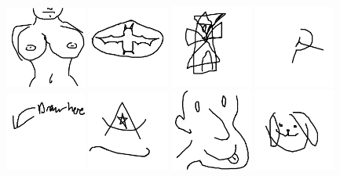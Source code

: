 \includegraphics[width=0.2\textwidth]{art/Safari_6.png}
\includegraphics[width=0.2\textwidth]{art/Safari_60.png}
\includegraphics[width=0.2\textwidth]{art/Safari_61.png}
\includegraphics[width=0.2\textwidth]{art/Safari_62.png}
\includegraphics[width=0.2\textwidth]{art/Safari_63.png}
\includegraphics[width=0.2\textwidth]{art/Safari_64.png}
\includegraphics[width=0.2\textwidth]{art/Safari_65.png}
\includegraphics[width=0.2\textwidth]{art/Safari_66.png}
